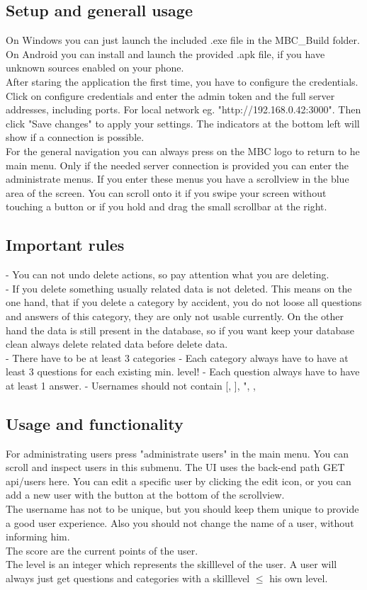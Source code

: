 \subsection{Setup and generall usage}
On Windows you can just launch the included .exe file in the MBC\_Build folder. On Android you can install and launch the provided .apk file, if you have unknown sources enabled on your phone. \\
After staring the application the first time, you have to configure the credentials. 
Click on configure credentials and enter the admin token and the full server addresses, including ports. For local network eg. "http://192.168.0.42:3000". Then click "Save changes" to apply your settings. The indicators at the bottom left will show if a connection is possible.\\
For the general navigation you can always press on the MBC logo to return to he main menu. Only if the needed server connection is provided you can enter the administrate menus.
If you enter these menus you have a scrollview in the blue area of the screen. You can scroll onto it if you swipe your screen without touching a button or if you hold and drag the small scrollbar at the right.

\subsection{Important rules}
- You can not undo delete actions, so pay attention what you are deleting.\\
- If you delete something usually related data is not deleted. This means on the one hand, that if you delete a category by accident, you do not loose all questions and answers of this category, they are only not usable currently. On the other hand the data is still present in the database, so if you want keep your database clean always delete related data before delete data.\\
- There have to be at least 3 categories
- Each category always have to have at least 3 questions for each existing min. level!
- Each question always have to have at least 1 answer.
- Usernames should not contain [, ], ", {, }

\subsection{Usage and functionality}
For administrating users press "administrate users" in the main menu. You can scroll and inspect users in this submenu. The UI uses the back-end path GET api/users here. You can edit a specific user by clicking the edit icon, or you can add a new user with the button at the bottom of the scrollview.\\
The username has not to be unique, but you should keep them unique to provide a good user experience. Also you should not change the name of a user, without informing him.\\
The score are the current points of the user.\\
The level is an integer which represents the skilllevel of the user. A user will always just get questions and categories with a skilllevel $\leq$ his own level.\\

